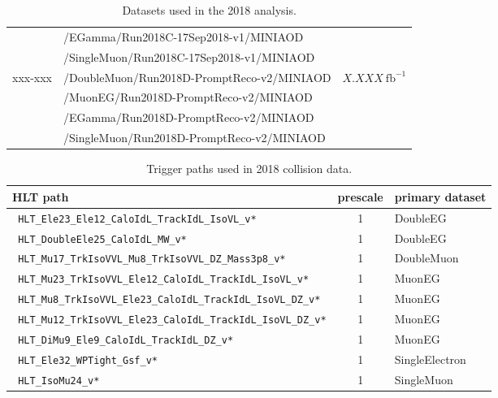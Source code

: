 \begin{table}[h]
\begin{tabular}{|l|l|l|}
		& /EGamma/Run2018C-17Sep2018-v1/MINIAOD &  \\ 
		& /SingleMuon/Run2018C-17Sep2018-v1/MINIAOD &  \\ 
		\hline
		\multirow{5}{*}{xxx-xxx} & /DoubleMuon/Run2018D-PromptReco-v2/MINIAOD &  \multirow{5}{*}{$X.XXX\ \text{fb}^{-1}$} \\  
		& /MuonEG/Run2018D-PromptReco-v2/MINIAOD &  \\ 
		& /EGamma/Run2018D-PromptReco-v2/MINIAOD &  \\ 
		& /SingleMuon/Run2018D-PromptReco-v2/MINIAOD &  \\ 
		\hline
		\hline
		\hline %
		\hline %
	\end{tabular}
	\small
	\caption{Datasets used in the 2018 analysis. }
	\label{tab:datasets_dataC}
\end{table}


\begin{table}[h]
	\scriptsize
	\centering
	\begin{tabular}{|l|c|l|} 
		\hline %
		HLT path                      				       & prescale  & primary dataset \\
		\hline %
		\verb| HLT_Ele23_Ele12_CaloIdL_TrackIdL_IsoVL_v*        | & 1 & DoubleEG \\
		\verb| HLT_DoubleEle25_CaloIdL_MW_v*              | & 1 & DoubleEG \\
		\verb| HLT_Mu17_TrkIsoVVL_Mu8_TrkIsoVVL_DZ_Mass3p8_v*     | & 1 & DoubleMuon \\
		\verb| HLT_Mu23_TrkIsoVVL_Ele12_CaloIdL_TrackIdL_IsoVL_v* | & 1 & MuonEG \\
		\verb| HLT_Mu8_TrkIsoVVL_Ele23_CaloIdL_TrackIdL_IsoVL_DZ_v* | & 1 & MuonEG \\
		\verb| HLT_Mu12_TrkIsoVVL_Ele23_CaloIdL_TrackIdL_IsoVL_DZ_v*| & 1 & MuonEG \\
		\verb| HLT_DiMu9_Ele9_CaloIdL_TrackIdL_DZ_v*| & 1 & MuonEG \\
		\verb| HLT_Ele32_WPTight_Gsf_v*                        | & 1 & SingleElectron \\
		\verb| HLT_IsoMu24_v*                                     | & 1 & SingleMuon \\
		\hline %
	\end{tabular}
	\small
	\caption{Trigger paths used in 2018 collision data.  }
	\label{tab:triggerPathsC}
\end{table}


